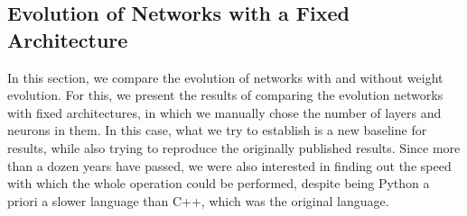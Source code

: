 \documentclass[conference]{IEEEtran}\usepackage[]{graphicx}\usepackage[]{color}
\begin{document}




\subsection{Evolution of Networks with a Fixed Architecture}

In this section, we compare the evolution of networks with and without weight
evolution. For this, we present the results of comparing the evolution networks
with fixed architectures, in which we manually chose the number of layers and
neurons in them. In this case, what we try to establish is a new
baseline for results, while also trying to reproduce the originally
published results. Since more than a dozen years have passed, we were
also interested in finding out the speed with which the whole
operation could be performed, despite being Python a priori a slower
language than C++, which was the original language.
\end{document}
